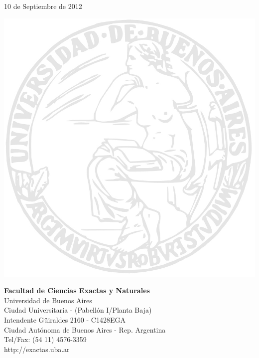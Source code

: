 \documentclass[]{article}
\begin{document}
\begin{titlepage}

{\large 10 de Septiembre de 2012}\\[2cm] %


\begin{minipage}[t]{\textwidth}
    \begin{minipage}[t]{.55 \textwidth}
        \includegraphics{logo_uba.jpg}
    \end{minipage}%
    \begin{minipage}[b]{.45 \textwidth}
        \textbf{\textsf{Facultad de Ciencias Exactas y Naturales}} \\
        \textsf{Universidad de Buenos Aires} \\
        {\scriptsize %
        Ciudad Universitaria - (Pabell\'on I/Planta Baja) \\
            Intendente G\"uiraldes 2160 - C1428EGA \\
        Ciudad Aut\'onoma de Buenos Aires - Rep. Argentina \\
            Tel/Fax: (54 11) 4576-3359 \\
        http://exactas.uba.ar \\
        }
    \end{minipage}
\end{minipage}%


\end{titlepage}
\end{document}
